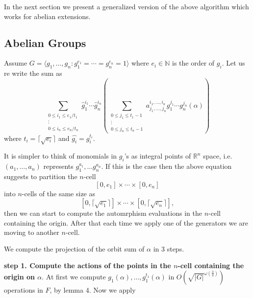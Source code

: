 \documentclass[sigconf]{acmart}
\theoremstyle{acmplain}
\begin{document}
In the next section
we present a generalized version of the above algorithm which works for abelian extensions.

\subsection{Abelian Groups}
Assume $G = \langle g_1, \ldots , g_n: g_{1}^{e_1} = \cdots = g_{n}^{e_n} = 1 \rangle$ where $ e_i \in \mathbb{N}$
is the order of $g_i$. Let us re write the sum as 
$$\sum_{\substack{0 \leq i_1 \leq e_1/t_1 \\ \vdots \\ 0 \leq i_n \leq e_n/t_n}} \hat{g}_1^{i_1} \cdots \hat{g}_n^{i_n}(\sum_{\substack{0 \leq j_1 \leq t_1-1\\ \vdots \\ 0 \leq j_n \leq t_n-1}} a^{i_1, \ldots , i_n}_{j_1, \ldots , j_n}g_1^{j_1}\cdots g_n^{j_n}(\alpha))$$
where $t_i = \lceil \sqrt{e_i}\rceil$ and $\hat{g_i} = g_i^{t_i}.$

It is simpler to think of monomials in $g_i$'s as integral points of $\mathbb{R}^n$ space, i.e.
$(a_1, \ldots , a_n)$ represents $g_1^{a_1}, \ldots g_n^{a_n}$. If this is the case then the above equation suggests to 
partition the $n$-cell $$[0,e_1] \times \cdots \times [0, e_n]$$ into $n$-cells of the same size as 
$$[0,\lceil \sqrt{e_1} \rceil] \times \cdots \times [0, \lceil \sqrt{e_n} \rceil],$$ 
then we can start to compute the automrphism evaluations in the $n$-cell containing the origin. After that each time we apply one 
of the generators we are moving to another $n$-cell.

We compute the projection of the orbit sum of $\alpha$ in 3 steps.

\textbf{step 1. Compute the actions of the points in the $n$-cell containing the origin on $\alpha$}. At first we compute 
$g_1(\alpha), \ldots , g_1^{t_1}(\alpha)$ in $O(\sqrt{\vert G \vert}^{\omega({\frac{3}{4}})})$ operations in $F$, by lemma 4. Now
we apply 
\end{document}
